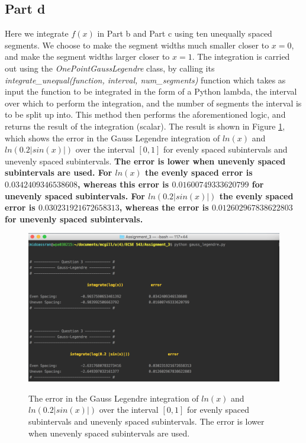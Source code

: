 \documentclass[11pt]{article}
\begin{document}
\FloatBarrier
\subsection*{Part d}
Here we integrate $f(x)$ in Part b and Part c using ten unequally spaced segments. We choose to make the segment widths much smaller closer to $x = 0$, and make the segment widths larger closer to $x=1$. The integration is carried out using the \textit{OnePointGaussLegendre} class, by calling its \textit{integrate\_unequal(function, interval, num\_segments)} function which takes as input the function to be integrated in the form of a Python lambda, the interval over which to perform the integration, and the number of segments the interval is to be split up into. This method then performs the aforementioned logic, and returns the result of the integration (scalar). The result is shown in Figure \ref{fig:GL_uneven}, which shows the error in the Gauss Legendre integration of $ln(x)$ and $ln(0.2 |sin(x)|)$ over the interval $[0,1]$ for evenly spaced subintervals and unevenly spaced subintervals. \textbf{The error is lower when unevenly spaced subintervals are used. For $ln(x)$ the evenly spaced error is $0.0342409346538608$, whereas this error is $0.01600749333620799$ for unevenly spaced subintervals. For $ln(0.2 |sin(x)|)$ the evenly spaced error is $0.030231921672658313$, whereas the error is $0.012602967838622803$ for unevenly spaced subintervals.}

\begin{figure}[!hbp]
	\begin{center}
		\begin{minipage}{\textwidth}
			\includegraphics[width= \textwidth]{o_GL_uneven.png}\\
		\end{minipage}
		\caption{\label{fig:GL_uneven}The error in the Gauss Legendre integration of $ln(x)$ and $ln(0.2 |sin(x)|)$ over the interval $[0,1]$ for evenly spaced subintervals and unevenly spaced subintervals. The error is lower when unevenly spaced subintervals are used.}
	\end{center}
\end{figure}
\end{document}
